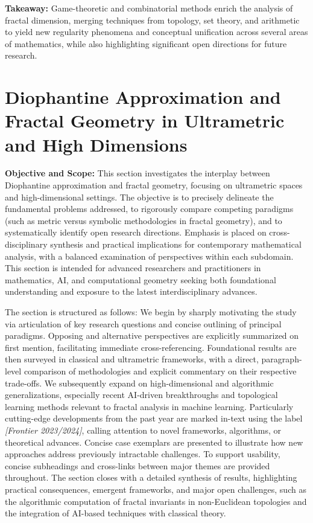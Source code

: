 \documentclass[sigconf]{acmart}
\begin{document}
\textbf{Takeaway:} Game-theoretic and combinatorial methods enrich the analysis of fractal dimension, merging techniques from topology, set theory, and arithmetic to yield new regularity phenomena and conceptual unification across several areas of mathematics, while also highlighting significant open directions for future research.

\section{Diophantine Approximation and Fractal Geometry in Ultrametric and High Dimensions}

\textbf{Objective and Scope:} This section investigates the interplay between Diophantine approximation and fractal geometry, focusing on ultrametric spaces and high-dimensional settings. The objective is to precisely delineate the fundamental problems addressed, to rigorously compare competing paradigms (such as metric versus symbolic methodologies in fractal geometry), and to systematically identify open research directions. Emphasis is placed on cross-disciplinary synthesis and practical implications for contemporary mathematical analysis, with a balanced examination of perspectives within each subdomain. This section is intended for advanced researchers and practitioners in mathematics, AI, and computational geometry seeking both foundational understanding and exposure to the latest interdisciplinary advances.

The section is structured as follows: We begin by sharply motivating the study via articulation of key research questions and concise outlining of principal paradigms. Opposing and alternative perspectives are explicitly summarized on first mention, facilitating immediate cross-referencing. Foundational results are then surveyed in classical and ultrametric frameworks, with a direct, paragraph-level comparison of methodologies and explicit commentary on their respective trade-offs. We subsequently expand on high-dimensional and algorithmic generalizations, especially recent AI-driven breakthroughs and topological learning methods relevant to fractal analysis in machine learning. Particularly cutting-edge developments from the past year are marked in-text using the label \textit{[Frontier 2023/2024]}, calling attention to novel frameworks, algorithms, or theoretical advances. Concise case exemplars are presented to illustrate how new approaches address previously intractable challenges. To support usability, concise subheadings and cross-links between major themes are provided throughout. The section closes with a detailed synthesis of results, highlighting practical consequences, emergent frameworks, and major open challenges, such as the algorithmic computation of fractal invariants in non-Euclidean topologies and the integration of AI-based techniques with classical theory.
\end{document}
